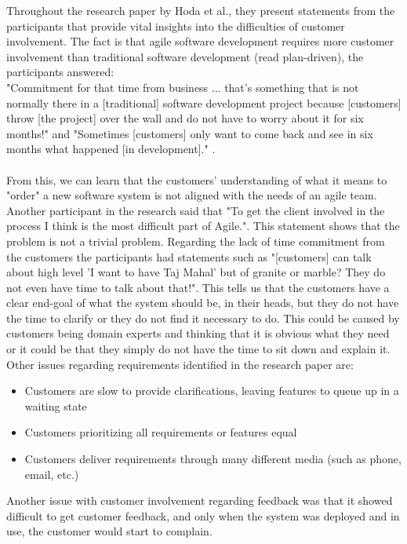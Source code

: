 Throughout the research paper by Hoda et al., they present statements from the participants that provide vital insights into the difficulties of customer involvement.
The fact is that agile software development requires more customer involvement than traditional software development (read plan-driven), the participants answered: \\
"Commitment for that time from business ... that's something that is not normally there in a [traditional] software development project because [customers] throw [the project] over the wall and do not have to worry about it for six months!" and "Sometimes [customers] only want to come back and see in six months what happened [in development]." \cite{Hoda2011TheIO}. \\ \\
From this, we can learn that the customers' understanding of what it means to "order" a new software system is not aligned with the needs of an agile team.
Another participant in the research said that "To get the client involved in the process I think is the most difficult part of Agile."\cite{Hoda2011TheIO}.
This statement shows that the problem is not a trivial problem.
Regarding the lack of time commitment from the customers the participants had statements such as "[customers] can talk about high level 'I want to have Taj Mahal' but of granite or marble? They do not even have time to talk about that!"\cite{Hoda2011TheIO}.
This tells us that the customers have a clear end-goal of what the system should be, in their heads, but they do not have the time to clarify or they do not find it necessary to do.
This could be caused by customers being domain experts and thinking that it is obvious what they need or it could be that they simply do not have the time to sit down and explain it.
Other issues regarding requirements identified in the research paper are:
\begin{itemize}
 \item Customers are slow to provide clarifications, leaving features to queue up in a waiting state
 \item Customers prioritizing all requirements or features equal
 \item Customers deliver requirements through many different media (such as phone, email, etc.)
\end{itemize}

Another issue with customer involvement regarding feedback was that it showed difficult to get customer feedback, and only when the system was deployed and in use, the customer would start to complain.

